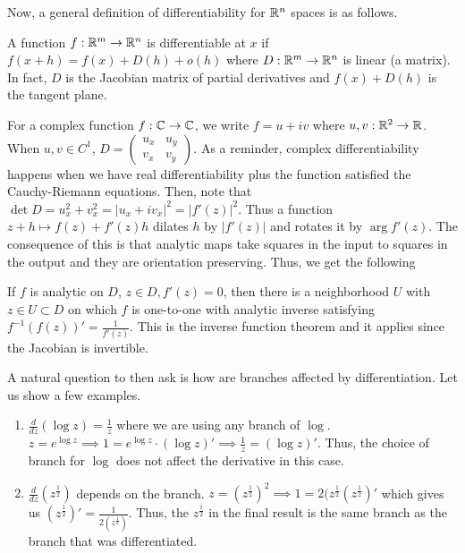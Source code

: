 \documentclass[11pt,leqno,oneside]{amsart}
\begin{document}
    Now, a general definition of differentiability for ${\mathbb R}^n$ spaces is as
    follows.
    \begin{defn}
        A function $f: {\mathbb R}^m \to {\mathbb R}^n$ is differentiable at $x$ if $f(x+h) =
        f(x)+D(h)+o(h)$ where $D: {\mathbb R}^m \to {\mathbb R}^n$ is linear (a matrix). In fact,
        $D$ is the Jacobian matrix of partial derivatives and $f(x)+D(h)$ is
        the tangent plane.
    \end{defn}
    For a complex function $f: {\mathbb C} \to {\mathbb C}$, we write $f = u+iv$ where $u,v: {\mathbb R}^2
    \to {\mathbb R}$. When $u,v \in C^1$, $D = \left( \begin{array}{cc}
        u_x & u_y \\
        v_x & v_y
    \end{array}\right)$. As a reminder, complex differentiability happens when
    we have real differentiability plus the function satisfied the
    Cauchy-Riemann equations. Then, note that $\det D = u_x^2 + v_x^2 =
    |u_x+iv_x|^2 = |f'(z)|^2$. Thus a function $z+h \mapsto f(z) + f'(z)h$
    dilates $h$ by $|f'(z)|$ and rotates it by $\arg f'(z)$. The consequence of
    this is that analytic maps take squares in the input to squares in the
    output and they are orientation preserving. Thus, we get the following
    \begin{rmk}
        If $f$ is analytic on $D$, $z \in D, f'(z) = 0$, then there is a
        neighborhood $U$ with $z \in U \subset D$ on which $f$ is one-to-one
        with analytic inverse satisfying $f^{-1}(f(z))' = \frac{1}{f'(z)}$.
        This is the inverse function theorem and it applies since the Jacobian
        is invertible.
    \end{rmk}
    A natural question to then ask is how are branches affected by
    differentiation. Let us show a few examples.
    \begin{example}
        \begin{enumerate}
            \item $\frac{d}{dz}(\log z) = \frac{1}{z}$ where we are using any
                branch of $\log$. $z = e^{\log z} \implies 1 = e^{\log z} \cdot
                (\log z)' \implies \frac{1}{z} = (\log z)'$. Thus, the choice
                of branch for $\log$ does not affect the derivative in this
                case.
            \item $\frac{d}{dz}(z^{\frac{1}{2}})$ depends on the branch. $z =
                (z^{\frac{1}{2}})^2 \implies 1 =
                2(z^{\frac{1}{2}}(z^{\frac{1}{2}})'$ which gives us
                $(z^{\frac{1}{2}})' = \frac{1}{2(z^\frac{1}{2})}$. Thus, the
                $z^\frac{1}{2}$ in the final result is the same branch as the
                branch that was differentiated.
        \end{enumerate}
    \end{example}
\end{document}
